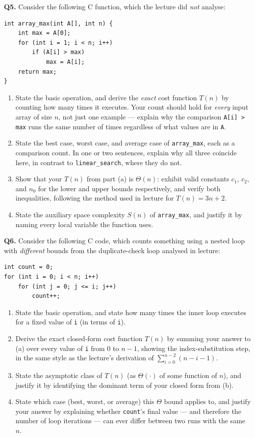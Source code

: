 \documentclass[11pt]{article}
\begin{document}
\textbf{Q5.} Consider the following C function, which the lecture did \emph{not} analyse:
\begin{verbatim}
int array_max(int A[], int n) {
    int max = A[0];
    for (int i = 1; i < n; i++)
        if (A[i] > max)
            max = A[i];
    return max;
}
\end{verbatim}
\begin{enumerate}
  \item[(a)] State the basic operation, and derive the \emph{exact} cost function $T(n)$ by counting how many times it executes. Your count should hold for \emph{every} input array of size $n$, not just one example --- explain why the comparison \texttt{A[i] > max} runs the same number of times regardless of what values are in \texttt{A}.
  \item[(b)] State the best case, worst case, and average case of \texttt{array\_max}, each as a comparison count. In one or two sentences, explain why all three coincide here, in contrast to \texttt{linear\_search}, where they do not.
  \item[(c)] Show that your $T(n)$ from part (a) is $\Theta(n)$: exhibit valid constants $c_1$, $c_2$, and $n_0$ for the lower and upper bounds respectively, and verify both inequalities, following the method used in lecture for $T(n) = 3n+2$.
  \item[(d)] State the auxiliary space complexity $S(n)$ of \texttt{array\_max}, and justify it by naming every local variable the function uses.
\end{enumerate}

\textbf{Q6.} Consider the following C code, which counts something using a nested loop with \emph{different} bounds from the duplicate-check loop analysed in lecture:
\begin{verbatim}
int count = 0;
for (int i = 0; i < n; i++)
    for (int j = 0; j <= i; j++)
        count++;
\end{verbatim}
\begin{enumerate}
  \item[(a)] State the basic operation, and state how many times the inner loop executes for a fixed value of \texttt{i} (in terms of \texttt{i}).
  \item[(b)] Derive the exact closed-form cost function $T(n)$ by summing your answer to (a) over every value of \texttt{i} from $0$ to $n-1$, showing the index-substitution step, in the same style as the lecture's derivation of $\sum_{i=0}^{n-2}(n-i-1)$.
  \item[(c)] State the asymptotic class of $T(n)$ (as $\Theta(\cdot)$ of some function of $n$), and justify it by identifying the dominant term of your closed form from (b).
  \item[(d)] State which case (best, worst, or average) this $\Theta$ bound applies to, and justify your answer by explaining whether \texttt{count}'s final value --- and therefore the number of loop iterations --- can ever differ between two runs with the same $n$.
\end{enumerate}
\end{document}
